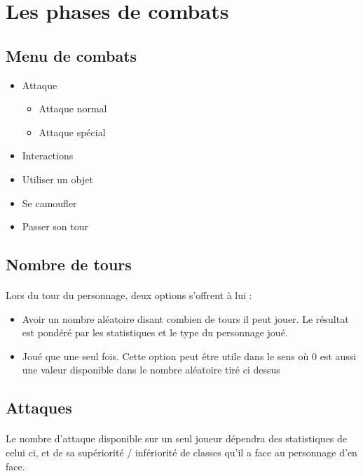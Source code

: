 \newpage
\section{Les phases de combats}

\subsection{Menu de combats}
\begin{itemize}
	\item Attaque \begin{itemize}
				      \item Attaque normal
					  \item Attaque spécial
				  \end{itemize}
	\item Interactions
	\item Utiliser un objet
	\item Se camoufler
	\item Passer son tour
\end{itemize}

\subsection{Nombre de tours} 
\paragraph{} Lors du tour du personnage, deux options s'offrent à lui : 
\begin{itemize}
	\item Avoir un nombre aléatoire disant combien de tours il peut jouer. Le résultat est pondéré par les statistiques et le type du personnage joué. 

	\item Joué que une seul fois. Cette option peut être utile dans le sens où 0 est aussi une valeur disponible dans le nombre aléatoire tiré ci dessus
\end{itemize}

\subsection{Attaques}
\paragraph{} Le nombre d'attaque disponible sur un seul joueur dépendra des statistiques de celui ci, et de sa supériorité / infériorité de classes qu'il a face au personnage d'en face.


